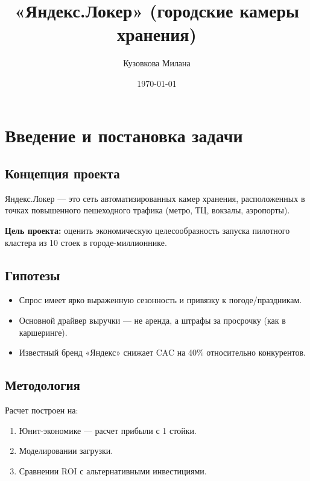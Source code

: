 \documentclass[12pt,a4paper]{article}
\title{«Яндекс.Локер» (городские камеры хранения)}
\author{Кузовкова Милана}
\date{\today}
\begin{document}
\maketitle
\tableofcontents
\newpage

\section{Введение и постановка задачи}
\subsection{Концепция проекта}
Яндекс.Локер — это сеть автоматизированных камер хранения, расположенных в точках повышенного пешеходного трафика (метро, ТЦ, вокзалы, аэропорты). 

\textbf{Цель проекта:} оценить экономическую целесообразность запуска пилотного кластера из 10 стоек в городе-миллионнике.

\subsection{Гипотезы}
\begin{itemize}
    \item Спрос имеет ярко выраженную сезонность и привязку к погоде/праздникам.
    \item Основной драйвер выручки — не аренда, а штрафы за просрочку (как в каршеринге).
    \item Известный бренд «Яндекс» снижает CAC на 40\% относительно конкурентов.
\end{itemize}

\subsection{Методология}
Расчет построен на:
\begin{enumerate}
    \item Юнит-экономике — расчет прибыли с 1 стойки.
    \item Моделировании загрузки.
    \item Сравнении ROI с альтернативными инвестициями.
\end{enumerate}
\end{document}
